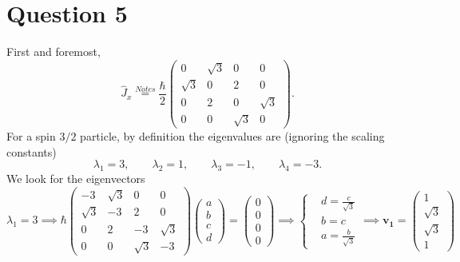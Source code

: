 \documentclass[12pt]{article}
\theoremstyle{definition}
\theoremstyle{definition}
\theoremstyle{definition}
\theoremstyle{definition}
\theoremstyle{definition}
\theoremstyle{example}
\theoremstyle{note}
\theoremstyle{remark}
\theoremstyle{example}
\begin{document}
		\section*{Question 5}
			First and foremost, 
			$$ \hat{J}_{x} \overset{Notes }{=}  \frac{\hbar}{2} \begin{pmatrix}
				0 & \sqrt{3} & 0 & 0 \\
				\sqrt{3} & 0 & 2 & 0\\
				0 & 2 & 0 & \sqrt{3} \\
				0 & 0 & \sqrt{3} & 0
			\end{pmatrix}.$$
			For a spin $3/2$ particle, by definition the eigenvalues are (ignoring the scaling constants)
			$$ \lambda_{1} = 3 , \qquad \lambda_{2} = 1 , \qquad \lambda_{3} = -1 ,\qquad \lambda_{4} = -3.$$
			We look for the eigenvectors 
			\begin{equation*}
			\lambda_{1} =3 \implies \hbar\begin{pmatrix}
			-3 & \sqrt{3} & 0 & 0 \\
			\sqrt{3} & -3 & 2 & 0\\
			0 & 2 & -3 & \sqrt{3} \\
			0 & 0 & \sqrt{3} & -3
			\end{pmatrix}\begin{pmatrix}
			a \\ b \\ c \\ d
			\end{pmatrix} = \begin{pmatrix}
			0 \\ 0 \\0  \\0 
			\end{pmatrix} \implies \begin{cases}
			&d = \frac{c}{\sqrt{3}}  \\
			&b = c\\
			&a = \frac{b}{\sqrt{3}}
			\end{cases} \implies \boldsymbol{v_{1}} = \begin{pmatrix}
			1 \\ \sqrt{3} \\ \sqrt{3} \\ 1
			\end{pmatrix}
			\end{equation*}
\end{document}
